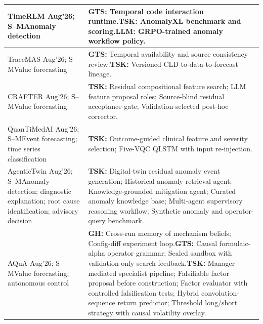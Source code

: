 \documentclass[preprints,article,submit,moreauthors]{Definitions/mdpi}
\newcommand{\typeSMshort}{\textsf{S--M}}
\begin{document}
\begin{longtable}{@{}>{\raggedright\arraybackslash}p{}p{}@{}}
TimeRLM \citep{timerlm2026} Aug'26; \typeSMshort{}\newline Anomaly detection & \textbf{GTS:} Temporal code interaction runtime.\newline\textbf{TSK:} AnomalyXL benchmark and scoring.\newline\textbf{LLM:} GRPO-trained anomaly workflow policy.\\\midrule
TraceMAS \citep{tracemas2026} Aug'26; \typeSMshort{}\newline Value forecasting & \textbf{GTS:} Temporal availability and source consistency review.\newline\textbf{TSK:} Versioned CLD-to-data-to-forecast lineage.\\\midrule
CRAFTER \citep{crafter2026} Aug'26; \typeSMshort{}\newline Value forecasting & \textbf{TSK:} Residual compositional feature search; LLM feature proposal roles; Source-blind residual acceptance gate; Validation-selected post-hoc corrector.\\\midrule
QuanTiMedAI \citep{quantimedai2026} Aug'26; \typeSMshort{}\newline Event forecasting; time series classification & \textbf{TSK:} Outcome-guided clinical feature and severity selection; Five-VQC QLSTM with input re-injection.\\\midrule
AgenticTwin \citep{agentictwin2026} Aug'26; \typeSMshort{}\newline Anomaly detection; diagnostic explanation; root cause identification; advisory decision & \textbf{TSK:} Digital-twin residual anomaly event generation; Historical anomaly retrieval agent; Knowledge-grounded mitigation agent; Curated anomaly knowledge base; Multi-agent supervisory reasoning workflow; Synthetic anomaly and operator-query benchmark.\\\midrule
AQuA \citep{aqua2026} Aug'26; \typeSMshort{}\newline Value forecasting; autonomous control & \textbf{GH:} Cross-run memory of mechanism beliefs; Config-diff experiment loop.\newline\textbf{GTS:} Causal formulaic-alpha operator grammar; Sealed sandbox with validation-only search feedback.\newline\textbf{TSK:} Manager-mediated specialist pipeline; Falsifiable factor proposal before construction; Factor evaluator with controlled falsification tests; Hybrid convolution-sequence return predictor; Threshold long/short strategy with causal volatility overlay.\\\midrule

\end{longtable}
\end{document}
